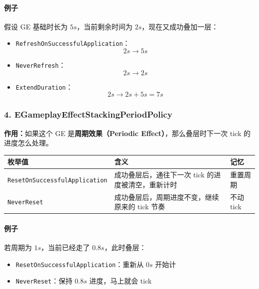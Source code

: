 \documentclass[CJKmath=true,10pt]{MyBook}
\begin{document}
\paragraph{例子}
假设 GE 基础时长为 $5s$，当前剩余时间为 $2s$，现在又成功叠加一层：

\begin{itemize}
	\item \texttt{RefreshOnSuccessfulApplication}：
	\[
	2s \rightarrow 5s
	\]
	\item \texttt{NeverRefresh}：
	\[
	2s \rightarrow 2s
	\]
	\item \texttt{ExtendDuration}：
	\[
	2s \rightarrow 2s + 5s = 7s
	\]
\end{itemize}

\subsubsection{4. EGameplayEffectStackingPeriodPolicy}

\textbf{作用：}如果这个 GE 是\textbf{周期效果（Periodic Effect）}，那么叠层时下一次 tick 的进度怎么处理。

\begin{longtable}{@{}p{}p{}p{}@{}}
	\toprule
	\textbf{枚举值} & \textbf{含义} & \textbf{记忆} \\
	\midrule
	\endhead
	
	\texttt{ResetOnSuccessfulApplication}
	&
	成功叠层后，通往下一次 tick 的进度被清空，重新计时
	&
	重置周期
	\\
	
	\texttt{NeverReset}
	&
	成功叠层后，周期进度不变，继续原来的 tick 节奏
	&
	不动 tick
	\\
	
	\bottomrule
\end{longtable}

\paragraph{例子}
若周期为 $1s$，当前已经走了 $0.8s$，此时叠层：

\begin{itemize}
	\item \texttt{ResetOnSuccessfulApplication}：重新从 $0s$ 开始计
	\item \texttt{NeverReset}：保持 $0.8s$ 进度，马上就会 tick
\end{itemize}

\end{document}
